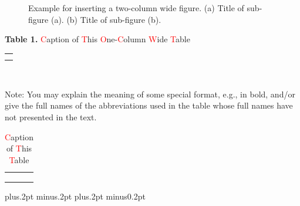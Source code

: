 \documentclass[twoside]{article}
\begin{document}
\begin{multicols}{2}
\setcounter{figure}{1}
\begin{figure}[!tb]
\centering
  \caption{Example for inserting a two-column wide figure. (a) Title of sub-figure (a). (b) Title of sub-figure (b).}
\end{figure}

\tabcolsep 12pt
\renewcommand\arraystretch{1.3}
\begin{center}
{\footnotesize{\bf Table 1.} \textcolor{red}{C}aption of \textcolor{red}{T}his \textcolor{red}{O}ne-\textcolor{red}{C}olumn \textcolor{red}{W}ide \textcolor{red}{T}able}\\
\vspace{2mm}
\footnotesize{
\begin{tabular*}{\linewidth}{c}\hline\hline\hline
\\\hline
\\
\\\hline\hline\hline
\end{tabular*}%
\\\vspace{1mm}\parbox{8.3cm}{Note: You may explain the meaning of some special format, e.g., in bold, and/or give the full names of the abbreviations used in the table whose full names have not presented in the text.}
}
\end{center}

\vspace{1mm}

\setcounter{table}{1}
\tabcolsep 9pt
\renewcommand\arraystretch{1.3}
\begin{table}[!htb]
\centering
\caption{\label{3} \textcolor{red}{C}aption of \textcolor{red}{T}his \textcolor{red}{T}able}\vspace{-2mm}
{\footnotesize
\begin{tabular*}{\linewidth}{c}\hline\hline\hline
\\\hline
\\
\\
\\\hline\hline\hline
\end{tabular*}%
}
\end{table}
\baselineskip=18pt plus.2pt minus.2pt
\parskip=0pt plus.2pt minus0.2pt


\end{multicols}
\end{document}
